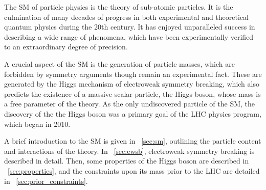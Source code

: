 
The \ac{SM} of particle physics is the theory of sub-atomic particles.
It is the culmination of many decades of progress in both experimental and theoretical
quantum physics during the 20th century. It has enjoyed unparalleled success in describing 
a wide range of phenomena, which have been experimentally verified to an extraordinary 
degree of precision.

A crucial aspect of the \ac{SM} is the generation of particle masses, which are forbidden 
by symmetry arguments though remain an experimental fact. These are generated by 
the Higgs mechanism of electroweak symmetry breaking, which also predicts the existence of 
a massive scalar particle, the Higgs boson, whose mass is a free parameter of the theory. 
As the only undiscovered particle of the \ac{SM}, the discovery of the the Higgs boson was 
a primary goal of the LHC physics program, which began in 2010.

A brief introduction to the \ac{SM} is given in \Section~\ref{sec:sm}, outlining the 
particle content and interactions of the theory. In \Section~\ref{sec:ewsb}, electroweak 
symmetry breaking is described in detail. Then, some properties of the Higgs boson are 
described in \Section~\ref{sec:properties}, and the constraints upon its mass prior to the 
\acs{LHC} are detailed in \Section~\ref{sec:prior_constraints}.
